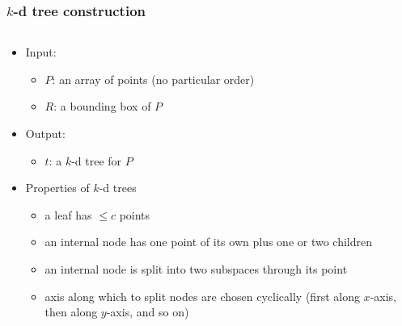 \documentclass[12pt,dvipdfmx]{beamer}
\newcommand{\ao}[1]{{\color{blue}#1}}
\begin{document}
\begin{frame}
\frametitle{$k$-d tree construction}
\begin{columns}
\begin{column}{0.6\textwidth}
\begin{itemize}
\item Input: 
  \begin{itemize}
  \item \ao{$P$}: an array of points (no particular order)
  \item \ao{$R$}: a bounding box of $P$
  \end{itemize}
\item Output:
  \begin{itemize}
  \item \ao{$t$}: a $k$-d tree for $P$
  \end{itemize}
\item Properties of $k$-d trees
  \begin{itemize}
  \item<2-> a leaf has $\leq c$ points
  \item<3-> an internal node has one point of its own plus one or two children
  \item<3-> an internal node is split into two subspaces through its point
  \item<4-> axis along which to split nodes are chosen cyclically 
    (first along $x$-axis, then along $y$-axis, and so on)
  \end{itemize}
\end{itemize}
\end{column}

\begin{column}{0.4\textwidth}
\def\svgwidth{0.6\textwidth}
\only<1>{}%

%

%
\only<4>{}%
%
\only<6>{}%
\end{column}
\end{columns}
\end{frame}
\end{document}
